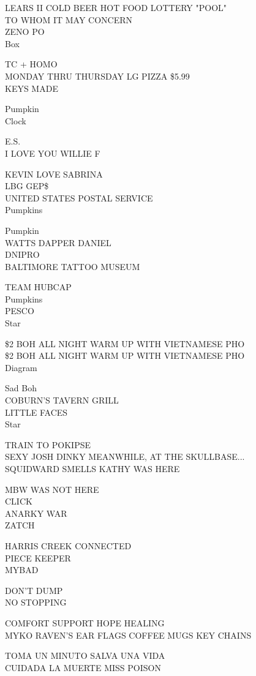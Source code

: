 \documentclass[10pt,letterpaper]{article}
\begin{document}
LEARS II COLD BEER HOT FOOD LOTTERY "POOL"\\
TO WHOM IT MAY CONCERN\\
ZENO PO\\
Box

TC + HOMO\\
MONDAY THRU THURSDAY LG PIZZA \$5.99\\
KEYS MADE

Pumpkin\\
Clock

E.S.\\
I LOVE YOU WILLIE F

KEVIN LOVE SABRINA\\
LBG GEP\$\\
UNITED STATES POSTAL SERVICE\\
Pumpkins

Pumpkin\\
WATTS DAPPER DANIEL\\
DNIPRO\\
BALTIMORE TATTOO MUSEUM

TEAM HUBCAP\\
Pumpkins\\
PESCO\\
Star

\$2 BOH ALL NIGHT WARM UP WITH VIETNAMESE PHO\\
\$2 BOH ALL NIGHT WARM UP WITH VIETNAMESE PHO\\
Diagram

Sad Boh\\
COBURN'S TAVERN GRILL\\
LITTLE FACES\\
Star

TRAIN TO POKIPSE\\
SEXY JOSH DINKY MEANWHILE, AT THE SKULLBASE...\\
SQUIDWARD SMELLS KATHY WAS HERE

MBW WAS NOT HERE\\
CLICK\\
ANARKY WAR\\
ZATCH

HARRIS CREEK CONNECTED\\
PIECE KEEPER\\
MYBAD

DON'T DUMP\\
NO STOPPING

COMFORT SUPPORT HOPE HEALING\\
MYKO RAVEN'S EAR FLAGS COFFEE MUGS KEY CHAINS

TOMA UN MINUTO SALVA UNA VIDA\\
CUIDADA LA MUERTE MISS POISON
\end{document}
